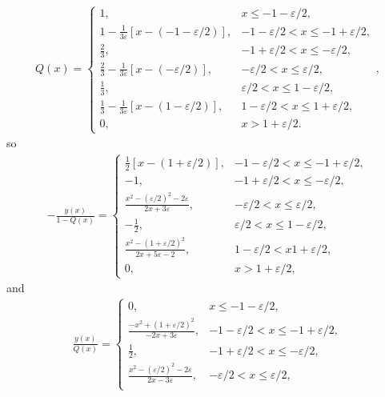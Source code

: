 \documentclass{assignment}
\begin{document}
\begin{sol}
\begin{itemize}
        \begin{align}
            Q(x)=\left\{\begin{array}{ll}
                1,&x\leq-1-\varepsilon/2,\\
                1-\frac{1}{3\varepsilon}[x-(-1-\varepsilon/2)],&-1-\varepsilon/2<x\leq-1+\varepsilon/2,\\
                \frac{2}{3},&-1+\varepsilon/2<x\leq-\varepsilon/2,\\
                \frac{2}{3}-\frac{1}{3\varepsilon}[x-(-\varepsilon/2)],&-\varepsilon/2<x\leq\varepsilon/2,\\
                \frac{1}{3},&\varepsilon/2<x\leq 1-\varepsilon/2,\\
                \frac{1}{3}-\frac{1}{3\varepsilon}[x-(1-\varepsilon/2)],&1-\varepsilon/2<x\leq 1+\varepsilon/2,\\
                0,&x>1+\varepsilon/2.
            \end{array}\right.,
        \end{align}
        so
        \begin{align}
            -\frac{y(x)}{1-Q(x)}=\left\{\begin{array}{ll}
                \frac{1}{2}[x-(1+\varepsilon/2)],&-1-\varepsilon/2<x\leq-1+\varepsilon/2,\\
                -1,&-1+\varepsilon/2<x\leq-\varepsilon/2,\\
                \frac{x^2-(\varepsilon/2)^2-2\varepsilon}{2x+3\varepsilon},&-\varepsilon/2<x\leq\varepsilon/2,\\
                -\frac{1}{2},&\varepsilon/2<x\leq 1-\varepsilon/2,\\
                \frac{x^2-(1+\varepsilon/2)^2}{2x+5\varepsilon-2},&1-\varepsilon/2<x1+\varepsilon/2,\\
                0,&x>1+\varepsilon/2,
            \end{array}\right.
        \end{align}
        and
        \begin{align}
            \frac{y(x)}{Q(x)}=\left\{\begin{array}{ll}
                0,&x\leq-1-\varepsilon/2,\\
                \frac{-x^2+(1+\varepsilon/2)^2}{-2x+3\varepsilon},&-1-\varepsilon/2<x\leq-1+\varepsilon/2,\\
                \frac{1}{2},&-1+\varepsilon/2<x\leq-\varepsilon/2,\\
                \frac{x^2-(\varepsilon/2)^2-2\varepsilon}{2x-3\varepsilon},&-\varepsilon/2<x\leq\varepsilon/2,\\

\end{array}
\end{align}
\end{itemize}
\end{sol}
\end{document}
